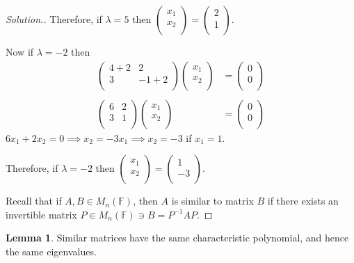 \documentclass[11pt,a4paper]{article}
\theoremstyle{definition}
\newtheorem{lem}[thm]{Lemma}
\newenvironment{solution}
  {\renewcommand{\qedsymbol}{}\begin{proof}[\textit{Solution}.]}
  {\end{proof}}
\begin{document}
\begin{solution}
Therefore, if $\lambda=5$ then $
\begin{pmatrix}
x_1\\x_2\\
\end{pmatrix}
=
\begin{pmatrix}
2\\1\\
\end{pmatrix}
$.

Now if $\lambda=-2$ then
\begin{align*}
\begin{pmatrix}
4+2&2\\3&-1+2\\
\end{pmatrix}
\begin{pmatrix}
x_1\\x_2\\
\end{pmatrix}
&=
\begin{pmatrix}
0\\0\\
\end{pmatrix}\\\\
\begin{pmatrix}
6&2\\3&1\\
\end{pmatrix}
\begin{pmatrix}
x_1\\x_2\\
\end{pmatrix}
&=
\begin{pmatrix}
0\\0\\
\end{pmatrix}
\end{align*}
$6x_1+2x_2=0\implies x_2=-3x_1\implies x_2=-3$ if $x_1=1$.

Therefore, if $\lambda=-2$ then $
\begin{pmatrix}
x_1\\x_2\\
\end{pmatrix}
=
\begin{pmatrix}
1\\-3\\
\end{pmatrix}
$.


Recall that if $A,B\in M_n(\mathbb{F})$, then $A$ is similar to matrix $B$ if there exists an invertible matrix $P\in M_n(\mathbb{F})\ni B=P^{-1}AP$.
\end{solution}
\begin{lem}\label{lem:similar-char-poly}
Similar matrices have the same characteristic polynomial, and hence the same
eigenvalues.
\end{lem}
\end{document}
